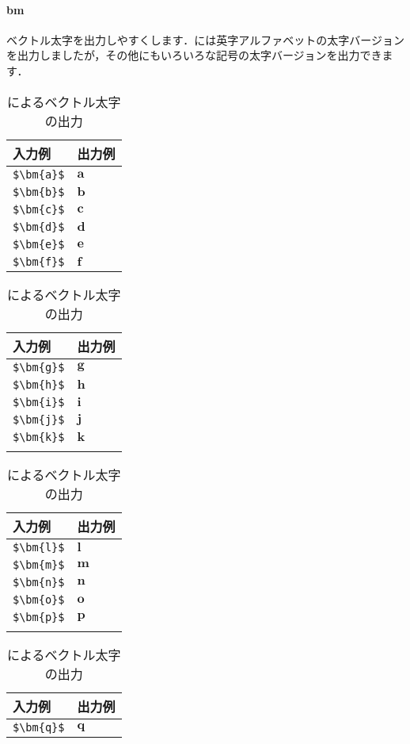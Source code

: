\documentclass[uplatex]{jsreport}
\begin{document}
\paragraph{bm} ベクトル太字を出力しやすくします．には英字アルファベットの太字バージョンを出力しましたが，その他にもいろいろな記号の太字バージョンを出力できます\cite{bm}．\par
\begin{table}[htbp]
  \centering
  \caption{によるベクトル太字の出力}
  \label{table:0.bm}
  \begin{tabular}{ll}\hline
    入力例 & 出力例 \\ \hline
    \verb|$\bm{a}$| & $\bm{a}$ \\
    \verb|$\bm{b}$| & $\bm{b}$ \\
    \verb|$\bm{c}$| & $\bm{c}$ \\
    \verb|$\bm{d}$| & $\bm{d}$ \\
    \verb|$\bm{e}$| & $\bm{e}$ \\
    \verb|$\bm{f}$| & $\bm{f}$ \\\hline
  \end{tabular}
  \begin{tabular}{ll}\hline
    入力例 & 出力例 \\ \hline
    \verb|$\bm{g}$| & $\bm{g}$ \\
    \verb|$\bm{h}$| & $\bm{h}$ \\
    \verb|$\bm{i}$| & $\bm{i}$ \\
    \verb|$\bm{j}$| & $\bm{j}$ \\
    \verb|$\bm{k}$| & $\bm{k}$ \\\\\hline
  \end{tabular}
  \begin{tabular}{ll}\hline
    入力例 & 出力例 \\ \hline
    \verb|$\bm{l}$| & $\bm{l}$ \\
    \verb|$\bm{m}$| & $\bm{m}$ \\
    \verb|$\bm{n}$| & $\bm{n}$ \\
    \verb|$\bm{o}$| & $\bm{o}$ \\
    \verb|$\bm{p}$| & $\bm{p}$ \\\\\hline
  \end{tabular}
  \begin{tabular}{ll}\hline
    入力例 & 出力例 \\ \hline
    \verb|$\bm{q}$| & $\bm{q}$ \\

\end{tabular}
\end{table}
\end{document}
